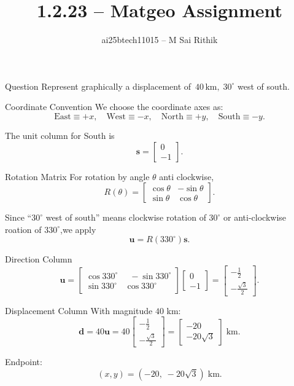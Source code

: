 \documentclass{beamer}
\title{1.2.23 -- Matgeo Assignment}
\author{ai25btech11015 -- M Sai Rithik}
\date{}
\begin{document}
\frame{\titlepage}

\begin{frame}{Question}
Represent graphically a displacement of \(\,40\,\text{km},\;30^\circ\) west of south.
\end{frame}

\begin{frame}{Coordinate Convention}
We choose the coordinate axes as:
\[
\text{East} \equiv +x,\quad
\text{West} \equiv -x,\quad
\text{North} \equiv +y,\quad
\text{South} \equiv -y.
\]

The unit column for South is
\[
\mathbf{s} = 
\begin{bmatrix}
0 \\ -1
\end{bmatrix}.
\]
\end{frame}

\begin{frame}{Rotation Matrix}
For rotation by angle \(\theta\) anti clockwise,
\[
R(\theta) =
\begin{bmatrix}
\cos\theta & -\sin\theta\\
\sin\theta & \cos\theta
\end{bmatrix}.
\]

Since “\(30^\circ\) west of south” means clockwise rotation of \(30^\circ\) or anti-clockwise roation of \(330^\circ\),we apply
\[
\mathbf{u} = R(330^\circ)\mathbf{s}.
\]
\end{frame}

\begin{frame}{Direction Column}
\[
\mathbf{u} =
\begin{bmatrix}
\cos 330^\circ & \;\;-\sin 330^\circ \\
\sin 330^\circ & \cos 330^\circ
\end{bmatrix}
\begin{bmatrix}
0 \\ -1
\end{bmatrix}
=
\begin{bmatrix}
-\tfrac{1}{2}\\[4pt]
-\tfrac{\sqrt{3}}{2}
\end{bmatrix}.
\]
\end{frame}

\begin{frame}{Displacement Column}
With magnitude \(40\) km:
\[
\mathbf{d} = 40\mathbf{u}
= 40
\begin{bmatrix}
-\tfrac{1}{2}\\[2pt]
-\tfrac{\sqrt{3}}{2}
\end{bmatrix}
=
\begin{bmatrix}
-20\\[2pt]
-20\sqrt{3}
\end{bmatrix}\;\text{km}.
\]

Endpoint:
\[
(x,y) = (-20,\; -20\sqrt{3}) \;\text{km}.
\]
\end{frame}
\end{document}
